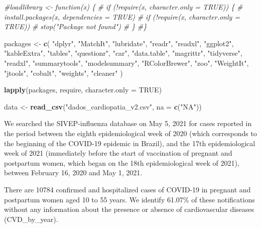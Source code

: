\documentclass[
]{article}
\newenvironment{Shaded}{\begin{snugshade}}{\end{snugshade}}
\newcommand{\AttributeTok}[1]{\textcolor[rgb]{0.13,0.29,0.53}{#1}}
\newcommand{\CommentTok}[1]{\textcolor[rgb]{0.56,0.35,0.01}{\textit{#1}}}
\newcommand{\ConstantTok}[1]{\textcolor[rgb]{0.56,0.35,0.01}{#1}}
\newcommand{\FunctionTok}[1]{\textcolor[rgb]{0.13,0.29,0.53}{\textbf{#1}}}
\newcommand{\NormalTok}[1]{#1}
\newcommand{\OtherTok}[1]{\textcolor[rgb]{0.56,0.35,0.01}{#1}}
\newcommand{\StringTok}[1]{\textcolor[rgb]{0.31,0.60,0.02}{#1}}
\begin{document}
\begin{Shaded}
\begin{Highlighting}[]
\CommentTok{\#loadlibrary \textless{}{-} function(x) \{}
\CommentTok{\#  if (!require(x, character.only = TRUE)) \{}
\CommentTok{\#    install.packages(x, dependencies = TRUE)}
\CommentTok{\#    if (!require(x, character.only = TRUE))}
\CommentTok{\#      stop("Package not found")}
\CommentTok{\#  \}}
\CommentTok{\#\}}

\NormalTok{packages }\OtherTok{\textless{}{-}} \FunctionTok{c}\NormalTok{(}
    \StringTok{"dplyr"}\NormalTok{,}
    \StringTok{"MatchIt"}\NormalTok{,}
    \StringTok{"lubridate"}\NormalTok{,}
    \StringTok{"readr"}\NormalTok{,}
    \StringTok{"readxl"}\NormalTok{,}
    \StringTok{"ggplot2"}\NormalTok{,}
    \StringTok{"kableExtra"}\NormalTok{,}
    \StringTok{"tables"}\NormalTok{,}
    \StringTok{"questionr"}\NormalTok{,}
    \StringTok{"car"}\NormalTok{,}
    \StringTok{"data.table"}\NormalTok{,}
    \StringTok{"magrittr"}\NormalTok{,}
    \StringTok{"tidyverse"}\NormalTok{,}
    \StringTok{"readxl"}\NormalTok{,}
    \StringTok{"summarytools"}\NormalTok{,}
    \StringTok{"modelsummary"}\NormalTok{,}
    \StringTok{"RColorBrewer"}\NormalTok{,}
    \StringTok{"zoo"}\NormalTok{,}
    \StringTok{"WeightIt"}\NormalTok{,}
    \StringTok{"jtools"}\NormalTok{,}
    \StringTok{"cobalt"}\NormalTok{,}
    \StringTok{"weights"}\NormalTok{, }
    \StringTok{"cleaner"}
\NormalTok{  )}

\FunctionTok{lapply}\NormalTok{(packages, require, }\AttributeTok{character.only =} \ConstantTok{TRUE}\NormalTok{)}

\NormalTok{data }\OtherTok{\textless{}{-}} \FunctionTok{read\_csv}\NormalTok{(}\StringTok{"dados\_cardiopatia\_v2.csv"}\NormalTok{, }\AttributeTok{na =} \FunctionTok{c}\NormalTok{(}\StringTok{"NA"}\NormalTok{))}
\end{Highlighting}
\end{Shaded}

We searched the SIVEP-influenza database on May 5, 2021 for cases
reported in the period between the eighth epidemiological week of 2020
(which corresponds to the beginning of the COVID-19 epidemic in Brazil),
and the 17th epidemiological week of 2021 (immediately before the start
of vaccination of pregnant and postpartum women, which began on the 18th
epidemiological week of 2021), between February 16, 2020 and May 1,
2021.

There are 10784 confirmed and hospitalized cases of COVID-19 in pregnant
and postpartum women aged 10 to 55 years. We identify 61.07\% of these
notifications without any information about the presence or absence of
cardiovascular diseases (CVD\_by\_year).
\end{document}
